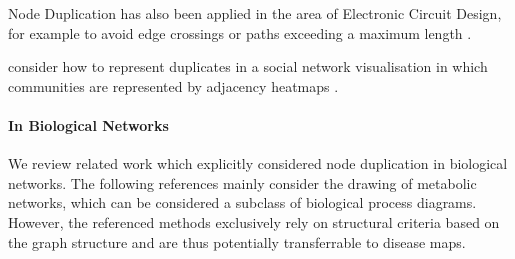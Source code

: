 \documentclass[
	fontsize=10pt, %
	twoside=true, %
	secnumdepth=1, %
  toc=indentunnumbered %
]{kaobook}
\begin{document}
Node Duplication has also been applied in the area of Electronic Circuit Design,
for example to avoid edge crossings \cite{li_EliminateWireCrossings_2008} or
paths exceeding a maximum length
\cite{paik_VertexSplittingDags_1998, mayer_GeneticAlgorithmsVertex_1993}.

\citeauthor{henr_ImprovingReadabilityClustered_2008}
 consider how to represent
duplicates in a social network visualisation in which communities are
represented by adjacency heatmaps
\cite{henr_ImprovingReadabilityClustered_2008}.


\paragraph{In Biological Networks} We review related work which explicitly
considered node duplication in biological networks. The following references
mainly consider the drawing of metabolic networks, which can be considered a
subclass of biological process diagrams. However, the referenced
methods exclusively rely on structural criteria based on the graph structure and
are thus potentially transferrable to disease maps.


%

\end{document}
